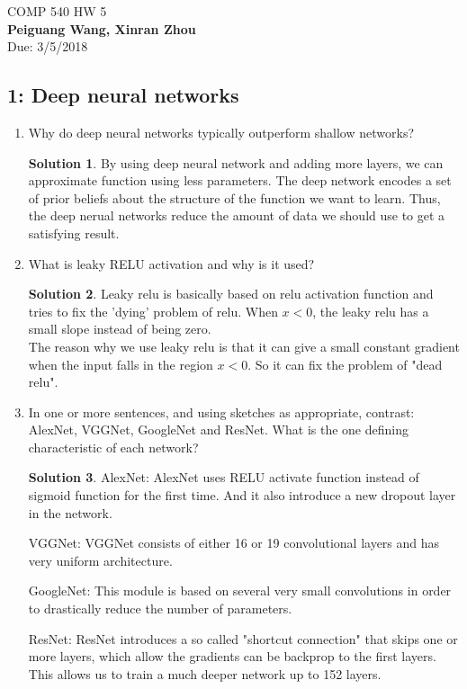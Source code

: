 \documentclass[]{book}
\theoremstyle{definition}
\newtheorem*{soln}{Solution}
\begin{document}
\begin{center}
{\Large COMP 540 \hspace{0.5cm} HW 5}\\
\textbf{Peiguang Wang, Xinran Zhou}\\ %
Due: 3/5/2018 %
\end{center}

\vspace{0.2 cm}


\subsection*{1: Deep neural networks }
\begin{enumerate}
	\item Why do deep neural networks typically outperform shallow networks?
	\begin{soln}
		By using deep neural network and adding more layers, we can approximate function using less parameters.
		The deep network encodes a set of prior beliefs about the structure of the function we want to learn. Thus, the deep nerual networks reduce the amount of data we should use to get a satisfying result.
	\end{soln}
	\item What is leaky RELU activation and why is it used?
	\begin{soln}
		Leaky relu is basically based on relu activation function and tries to fix the 'dying' problem of relu. When $x<0$, the leaky relu has a small slope instead of being zero.\\
		The reason why we use leaky relu is that it can give a small constant gradient when the input falls in the region $x<0$. So it can fix the problem of "dead relu". 
	\end{soln}
	\item In one or more sentences, and using sketches as appropriate, contrast: AlexNet, VGGNet, GoogleNet and ResNet. What is the one defining characteristic of each network?
	\begin{soln}
		AlexNet: AlexNet uses RELU activate function instead of sigmoid function for the first time. And it also introduce a new dropout layer in the network.
		
		VGGNet: VGGNet consists of either 16 or 19 convolutional layers and has very uniform architecture.
		
		GoogleNet: This module is based on several very small convolutions in order to drastically reduce the number of parameters. 
		
		ResNet: ResNet introduces a so called "shortcut connection" that skips one or more layers, which allow the gradients can be backprop to the first layers. This allows us to train a much deeper network up to 152 layers.
	\end{soln}
	
\end{enumerate}
\end{document}

